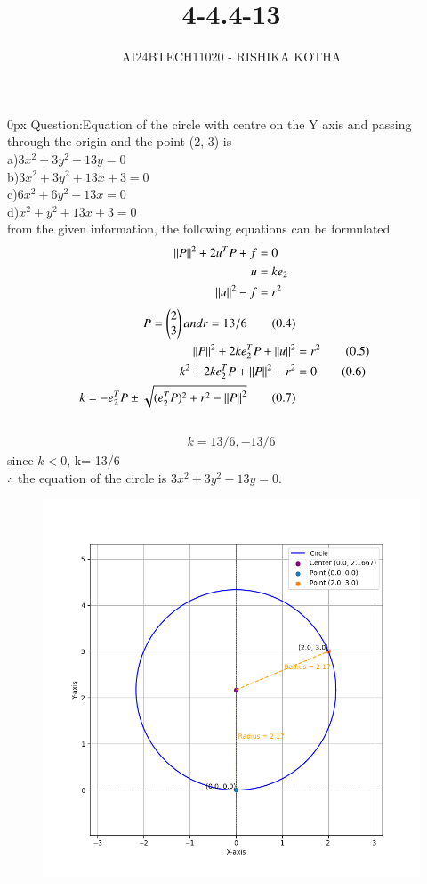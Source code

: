 \documentclass[journal]{IEEEtran}
\begin{document}

\vspace{3cm}

\title{4-4.4-13}
\author{AI24BTECH11020 - RISHIKA KOTHA}
{\let\newpage\relax\maketitle}

\renewcommand{\thefigure}{\theenumi}
\renewcommand{\thetable}{\theenumi}
\setlength{\intextsep}{10pt} %


\renewcommand{\thetable}{\theenumi}
\parindent 0px
Question:Equation of the circle with centre on the Y axis and passing through the origin and the point (2, 3) is
\\
a)$3x^2+3y^2-13y=0$\\
b)$3x^2+3y^2+13x+3=0$\\
c)$6x^2+6y^2-13x=0$\\
d)$x^2+y^2+13x+3=0$\\
\solution
from the given information, the following equations can be formulated 
\begin{align}
	\left\lVert P\right\rVert^2+2u^TP+f&=0  \\
	u&=ke_2\\
	\left\lVert u\right\rVert^2-f&=r^2
\end{align}
\begin{align}
	P=\begin{pmatrix}2\\3\end{pmatrix} and r=13/6\tag{0.4} \\
	\left\lVert P\right\rVert^2+2ke_2^TP+\left\lVert u\right\rVert^2&=r^2 \tag{0.5} \\
	k^2+2ke_2^TP+\left\lVert P\right\rVert^2-r^2 &=0 \tag{0.6} \\
	k=-e_2^TP \pm \sqrt{(e_2^TP)^2+r^2-\left\lVert P\right\rVert^2} \tag{0.7}
\end{align}
	\\
\begin{align}
	k=13/6,-13/6 \tag{0.8}
\end{align}
since $k<0$, k=-13/6\\
$\therefore$ the equation of the circle is $3x^2+3y^2-13y=0$.
\begin{table}[h!]    
  \centering
  
	\label{7-7.2-19}
\end{table}
\begin{figure}[h!]
	\centering
	\includegraphics[width=0.7\linewidth]{figs/Fig1.png}
\end{figure}
\end{document}
